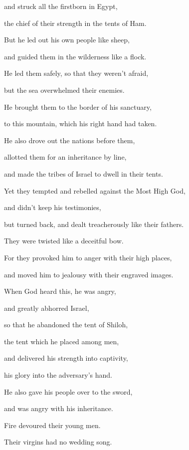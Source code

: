 {\par }{\Q {}and struck all the firstborn in Egypt,
\par }{\QB the chief of their strength in the tents of Ham.
\par }{\Q {}But he led out his own people like sheep,
\par }{\QB and guided them in the wilderness like a flock.
\par }{\Q {}He led them safely, so that they weren’t afraid,
\par }{\QB but the sea overwhelmed their enemies.
\par }{\Q {}He brought them to the border of his sanctuary,
\par }{\QB to this mountain, which his right hand had taken.
\par }{\Q {}He also drove out the nations before them,
\par }{\QB allotted them for an inheritance by line,
\par }{\QB and made the tribes of Israel to dwell in their tents.
\par }{\Q {}Yet they tempted and rebelled against the Most High God,
\par }{\QB and didn’t keep his testimonies,
\par }{\Q {}but turned back, and dealt treacherously like their fathers.
\par }{\QB They were twisted like a deceitful bow.
\par }{\Q {}For they provoked him to anger with their high places,
\par }{\QB and moved him to jealousy with their engraved images.
\par }{\Q {}When God heard this, he was angry,
\par }{\QB and greatly abhorred Israel,
\par }{\Q {}so that he abandoned the tent of Shiloh,
\par }{\QB the tent which he placed among men,
\par }{\Q {}and delivered his strength into captivity,
\par }{\QB his glory into the adversary’s hand.
\par }{\Q {}He also gave his people over to the sword,
\par }{\QB and was angry with his inheritance.
\par }{\Q {}Fire devoured their young men.
\par }{\QB Their virgins had no wedding song.
}
